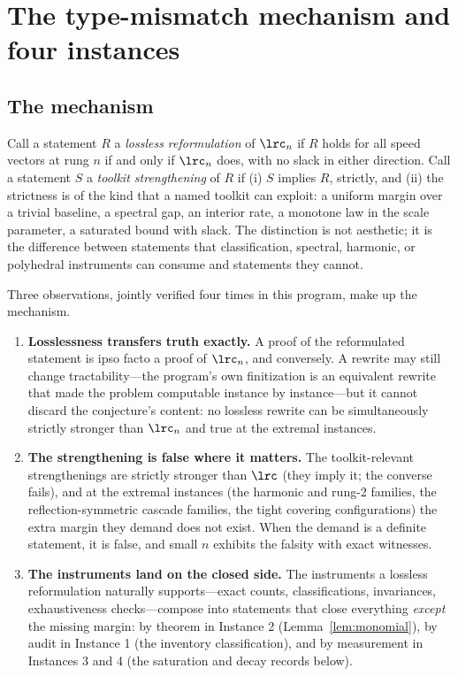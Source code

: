 
\section{The type-mismatch mechanism and four instances}\label{sec:tm}

\subsection{The mechanism}\label{sec:tm-mech}

Call a statement $R$ a \emph{lossless reformulation} of $\lrc_n$ if $R$
holds for all speed vectors at rung $n$ if and only if $\lrc_n$ does, with
no slack in either direction. Call a statement $S$ a \emph{toolkit
strengthening} of $R$ if (i) $S$ implies $R$, strictly, and (ii) the
strictness is of the kind that a named toolkit can exploit: a uniform
margin over a trivial baseline, a spectral gap, an interior rate, a
monotone law in the scale parameter, a saturated bound with slack. The
distinction is not aesthetic; it is the difference between statements
that classification, spectral, harmonic, or polyhedral instruments can
consume and statements they cannot.

Three observations, jointly verified four times in this program, make up
the mechanism.

\begin{enumerate}[leftmargin=1.6em,itemsep=2pt]
\item \textbf{Losslessness transfers truth exactly.} A proof of the
reformulated statement is ipso facto a proof of $\lrc_n$, and conversely.
A rewrite may still change tractability---the program's own finitization
is an equivalent rewrite that made the problem computable instance by
instance---but it cannot discard the conjecture's content: no lossless
rewrite can be simultaneously strictly stronger than $\lrc_n$ and true
at the extremal instances.
\item \textbf{The strengthening is false where it matters.} The
toolkit-relevant strengthenings are strictly stronger than $\lrc$ (they
imply it; the converse fails), and at the extremal instances (the
harmonic and rung-2 families, the reflection-symmetric cascade families,
the tight covering configurations) the extra margin they demand does not
exist. When the demand is a definite statement, it is false, and small
$n$ exhibits the falsity with exact witnesses.
\item \textbf{The instruments land on the closed side.} The instruments a
lossless reformulation naturally supports---exact counts,
classifications, invariances, exhaustiveness checks---compose into
statements that close everything \emph{except} the missing margin: by
theorem in Instance 2 (Lemma~\ref{lem:monomial}), by audit in Instance 1
(the inventory classification), and by measurement in Instances 3 and 4
(the saturation and decay records below).
\end{enumerate}

